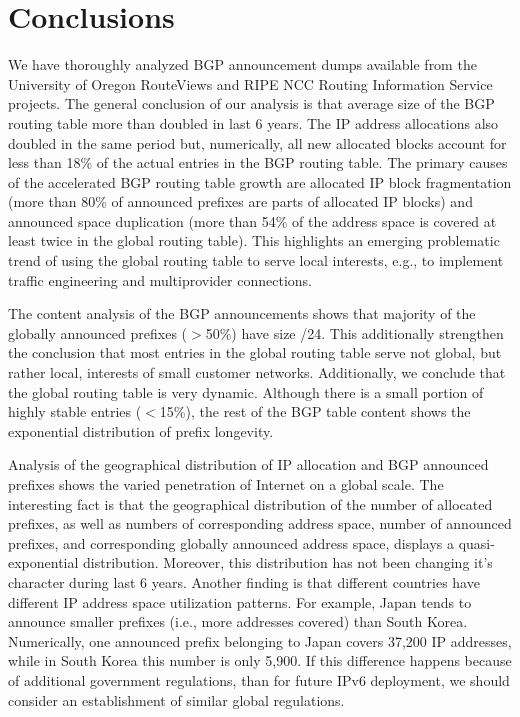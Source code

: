 \section{Conclusions}
\label{sec:conclusions}

We have thoroughly analyzed BGP announcement dumps available from the
University of Oregon RouteViews and RIPE NCC Routing Information Service
projects. The general conclusion of our analysis is that average size of the
BGP routing table more than doubled in last 6 years. The IP address
allocations also doubled in the same period but, numerically, all new
allocated blocks account for less than 18\% of the actual entries in the BGP
routing table. The primary causes of the accelerated BGP routing table growth
are allocated IP block fragmentation (more than 80\% of announced prefixes are
parts of allocated IP blocks) and announced space duplication (more than 54\%
of the address space is covered at least twice in the global routing table).
This highlights an emerging problematic trend of using the global routing
table to serve local interests, e.g., to implement traffic engineering and
multiprovider connections.

The content analysis of the BGP announcements shows that majority of the
globally announced prefixes ($>$50\%) have size /24. This additionally
strengthen the conclusion that most entries in the global routing table serve
not global, but rather local, interests of small customer networks.
Additionally, we conclude that the global routing table is very dynamic.
Although there is a small portion of highly stable entries ($<$15\%), the rest
of the BGP table content shows the exponential distribution of prefix
longevity.

Analysis of the geographical distribution of IP allocation and BGP announced
prefixes shows the varied penetration of Internet on a global scale. The
interesting fact is that the geographical distribution of the number of
allocated prefixes, as well as numbers of corresponding address space, number
of announced prefixes, and corresponding globally announced address space,
displays a quasi-exponential distribution. Moreover, this distribution has not
been changing it's character during last 6 years. Another finding is that
different countries have different IP address space utilization patterns. For
example, Japan tends to announce smaller prefixes (i.e., more addresses
covered) than South Korea. Numerically, one announced prefix belonging to
Japan covers 37,200 IP addresses, while in South Korea this number is only
5,900. If this difference happens because of additional government
regulations, than for future IPv6 deployment, we should consider an
establishment of similar global regulations.
